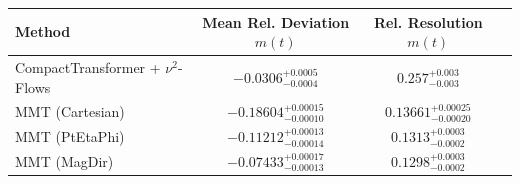     \begin{tabular}{lccc}
        \toprule
        Method & Mean Rel. Deviation $m(t)$ & Rel. Resolution $m(t)$ \\
        \midrule
        CompactTransformer + $\nu^2$-Flows & $-0.0306^{+0.0005}_{-0.0004}$ & $0.257^{+0.003}_{-0.003}$ \\
        MMT (Cartesian) & $-0.18604^{+0.00015}_{-0.00010}$ & $0.13661^{+0.00025}_{-0.00020}$ \\
        MMT (PtEtaPhi) & $-0.11212^{+0.00013}_{-0.00014}$ & $0.1313^{+0.0003}_{-0.0002}$ \\
        MMT (MagDir) & $-0.07433^{+0.00017}_{-0.00013}$ & $0.1298^{+0.0003}_{-0.0002}$ \\
        \bottomrule
    \end{tabular}